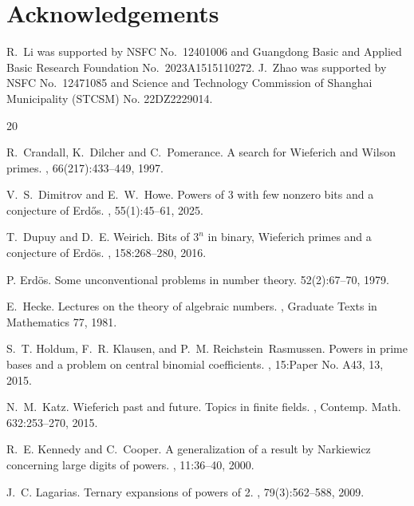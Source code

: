 \documentclass[12pt]{amsart}
\theoremstyle{plain}
\theoremstyle{definition}
\theoremstyle{remark}
\numberwithin{equation}{section}
\begin{document}
	\section*{Acknowledgements}
	R.~Li was supported by NSFC No.~12401006 and Guangdong Basic and
	Applied Basic Research Foundation No.~2023A1515110272. J.~Zhao was supported by NSFC No.~12471085 and Science and Technology Commission of Shanghai Municipality (STCSM) No. 22DZ2229014.
	
	
	
	
	
	
	\begin{thebibliography}{20}
		
		R.~Crandall, K.~Dilcher and C.~Pomerance.
		\newblock A search for {W}ieferich and {W}ilson primes.
		, 66(217):433--449, 1997.
		
		V.~S.~Dimitrov and E.~W.~Howe.
		\newblock Powers of 3 with few nonzero bits and a conjecture of {E}rd\H
		os.
		, 55(1):45--61, 2025.
		
		T.~Dupuy and D.~E. Weirich.
		\newblock Bits of {$3^n$} in binary, {W}ieferich primes and a conjecture of
		{E}rd\"{o}s.
		, 158:268--280, 2016.
		
		
		P. Erd\"os.
		\newblock Some unconventional problems in number theory.
		 52(2):67--70, 1979.	
		
		E.~Hecke.
		\newblock Lectures on the theory of algebraic numbers.
		, Graduate Texts in Mathematics 77, 1981.
		
		S.~T. Holdum, F.~R. Klausen, and P.~M. Reichstein~Rasmussen.
		\newblock Powers in prime bases and a problem on central binomial coefficients.
		, 15:Paper No. A43, 13, 2015.
		
		N.~M.~Katz.
		\newblock Wieferich past and future. Topics in finite fields. 
		, Contemp. Math. 632:253--270, 2015.
		
		R.~E. Kennedy and C.~Cooper.
		\newblock A generalization of a result by {N}arkiewicz concerning large digits
		of powers.
		, 11:36--40,
		2000.
		
		J.~C. Lagarias.
		\newblock Ternary expansions of powers of 2.
		, 79(3):562--588, 2009.
		

\end{thebibliography}
\end{document}
